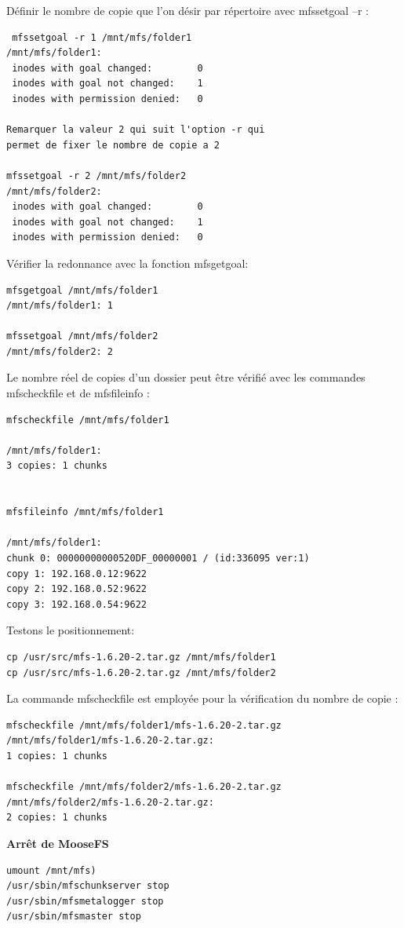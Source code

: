 \documentclass[12pt]{report}
\begin{document}
Définir le nombre de copie que l'on désir par répertoire avec mfssetgoal –r :
\begin{lstlisting}
 mfssetgoal -r 1 /mnt/mfs/folder1
/mnt/mfs/folder1:
 inodes with goal changed:        0
 inodes with goal not changed:    1
 inodes with permission denied:   0

Remarquer la valeur 2 qui suit l'option -r qui 
permet de fixer le nombre de copie a 2

mfssetgoal -r 2 /mnt/mfs/folder2
/mnt/mfs/folder2:
 inodes with goal changed:        0
 inodes with goal not changed:    1
 inodes with permission denied:   0
	  \end{lstlisting}
Vérifier la redonnance avec la fonction mfsgetgoal:
\begin{lstlisting}
mfsgetgoal /mnt/mfs/folder1
/mnt/mfs/folder1: 1

mfssetgoal /mnt/mfs/folder2
/mnt/mfs/folder2: 2
	  \end{lstlisting}
Le nombre réel de copies d'un dossier peut être vérifié avec les commandes mfscheckfile et de mfsfileinfo :
\begin{lstlisting}
mfscheckfile /mnt/mfs/folder1

/mnt/mfs/folder1:
3 copies: 1 chunks


mfsfileinfo /mnt/mfs/folder1

/mnt/mfs/folder1:
chunk 0: 00000000000520DF_00000001 / (id:336095 ver:1)
copy 1: 192.168.0.12:9622
copy 2: 192.168.0.52:9622
copy 3: 192.168.0.54:9622
\end{lstlisting}
Testons le positionnement:
\begin{lstlisting}
cp /usr/src/mfs-1.6.20-2.tar.gz /mnt/mfs/folder1
cp /usr/src/mfs-1.6.20-2.tar.gz /mnt/mfs/folder2
	  \end{lstlisting}
La commande mfscheckfile est employée pour la vérification du nombre de copie :
\begin{lstlisting}
mfscheckfile /mnt/mfs/folder1/mfs-1.6.20-2.tar.gz
/mnt/mfs/folder1/mfs-1.6.20-2.tar.gz:
1 copies: 1 chunks

mfscheckfile /mnt/mfs/folder2/mfs-1.6.20-2.tar.gz
/mnt/mfs/folder2/mfs-1.6.20-2.tar.gz:
2 copies: 1 chunks
	  \end{lstlisting}
\textbf{Arrêt de MooseFS}\\
\begin{lstlisting}
umount /mnt/mfs)
/usr/sbin/mfschunkserver stop
/usr/sbin/mfsmetalogger stop
/usr/sbin/mfsmaster stop
	  \end{lstlisting}
\end{document}
